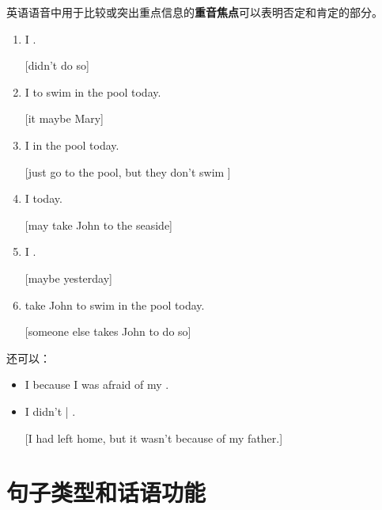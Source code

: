 英语语音中用于比较或突出重点信息的\textbf{重音焦点}可以表明否定和肯定的部分。
\begin{enumerate}
\item I .

  [didn't do so]
\item I  to swim in the pool today.

  [it maybe Mary]
\item I  in the pool today.

  [just go to the pool, but they don't swim ]
\item I  today.

  [may take John to the seaside]
\item I .

  [maybe yesterday]
\item {} take John to swim in the pool today.

  [someone else takes John to do so]
\end{enumerate}

还可以：
\begin{itemize}
\item I  because I was afraid of my .
\item I didn't | .

  [I had left home, but it wasn't because of my father.]
\end{itemize}

\section{句子类型和话语功能}

